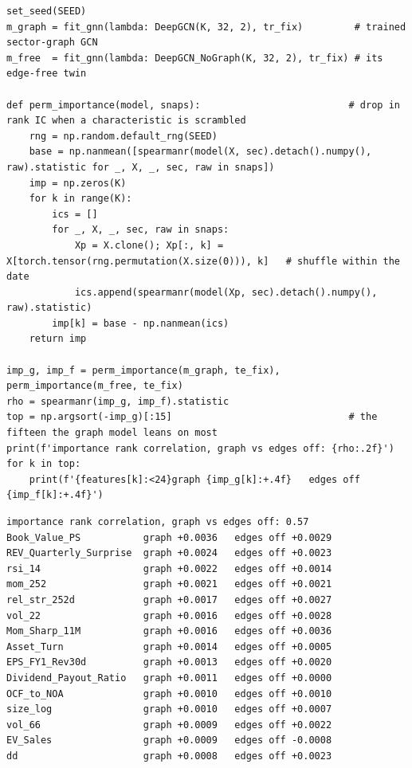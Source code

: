 \begin{verbatim}
set_seed(SEED)
m_graph = fit_gnn(lambda: DeepGCN(K, 32, 2), tr_fix)         # trained sector-graph GCN
m_free  = fit_gnn(lambda: DeepGCN_NoGraph(K, 32, 2), tr_fix) # its edge-free twin

def perm_importance(model, snaps):                          # drop in rank IC when a characteristic is scrambled
    rng = np.random.default_rng(SEED)
    base = np.nanmean([spearmanr(model(X, sec).detach().numpy(), raw).statistic for _, X, _, sec, raw in snaps])
    imp = np.zeros(K)
    for k in range(K):
        ics = []
        for _, X, _, sec, raw in snaps:
            Xp = X.clone(); Xp[:, k] = X[torch.tensor(rng.permutation(X.size(0))), k]   # shuffle within the date
            ics.append(spearmanr(model(Xp, sec).detach().numpy(), raw).statistic)
        imp[k] = base - np.nanmean(ics)
    return imp

imp_g, imp_f = perm_importance(m_graph, te_fix), perm_importance(m_free, te_fix)
rho = spearmanr(imp_g, imp_f).statistic
top = np.argsort(-imp_g)[:15]                               # the fifteen the graph model leans on most
print(f'importance rank correlation, graph vs edges off: {rho:.2f}')
for k in top:
    print(f'{features[k]:<24}graph {imp_g[k]:+.4f}   edges off {imp_f[k]:+.4f}')
\end{verbatim}

\begin{verbatim}
importance rank correlation, graph vs edges off: 0.57
Book_Value_PS           graph +0.0036   edges off +0.0029
REV_Quarterly_Surprise  graph +0.0024   edges off +0.0023
rsi_14                  graph +0.0022   edges off +0.0014
mom_252                 graph +0.0021   edges off +0.0021
rel_str_252d            graph +0.0017   edges off +0.0027
vol_22                  graph +0.0016   edges off +0.0028
Mom_Sharp_11M           graph +0.0016   edges off +0.0036
Asset_Turn              graph +0.0014   edges off +0.0005
EPS_FY1_Rev30d          graph +0.0013   edges off +0.0020
Dividend_Payout_Ratio   graph +0.0011   edges off +0.0000
OCF_to_NOA              graph +0.0010   edges off +0.0010
size_log                graph +0.0010   edges off +0.0007
vol_66                  graph +0.0009   edges off +0.0022
EV_Sales                graph +0.0009   edges off -0.0008
dd                      graph +0.0008   edges off +0.0023
\end{verbatim}

